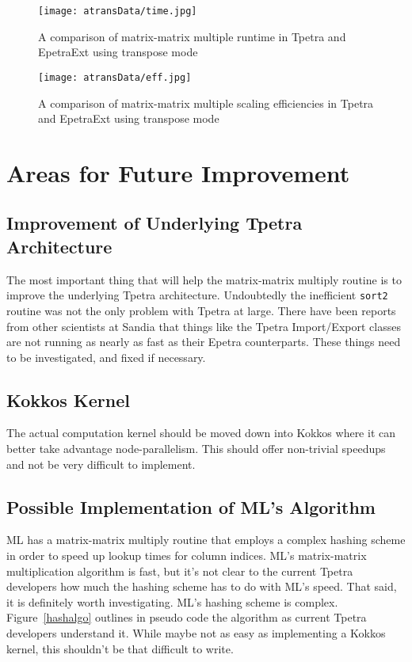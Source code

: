 \documentclass[pdf,12pt, strict]{SANDreport}
\begin{document}
\begin{figure}
\centering
\texttt{[image: atransData/time.jpg]}
\caption[Transpose Time Comparison]{A comparison of matrix-matrix multiple runtime in Tpetra and EpetraExt using transpose mode}
\label{transtime}
\end{figure}

\begin{figure}
\centering
\texttt{[image: atransData/eff.jpg]}
\caption[Transpose Efficiency Comparison]{A comparison of matrix-matrix multiple scaling efficiencies in Tpetra and EpetraExt using transpose mode}
\label{transeff}
\end{figure}

\section{Areas for Future Improvement}
\subsection{Improvement of Underlying Tpetra Architecture}
The most important thing that will help the matrix-matrix multiply routine is to improve the underlying Tpetra architecture. 
Undoubtedly the inefficient \verb!sort2! routine was not the only problem with Tpetra at large. There have been reports from other 
scientists at Sandia that things like the Tpetra Import/Export classes are not running as nearly as fast as their Epetra 
counterparts. These things need to be investigated, and fixed if necessary.

\subsection{Kokkos Kernel}
The actual computation kernel should be moved down into Kokkos where it can better take advantage node-parallelism. 
This should offer non-trivial speedups and not be very difficult to implement.

\subsection{Possible Implementation of ML's Algorithm}
ML has a matrix-matrix multiply routine that employs a complex hashing scheme in order to speed up lookup times for 
column indices. ML's matrix-matrix multiplication algorithm is fast, but it's not clear to the current Tpetra developers 
how much the hashing scheme has to do with ML's speed. That said, it is definitely worth investigating. ML's hashing scheme 
is complex. Figure~\ref{hashalgo} outlines in pseudo code the algorithm as current Tpetra developers 
understand it. While maybe not as easy as implementing a Kokkos kernel, this shouldn't be that difficult to write.
\end{document}
